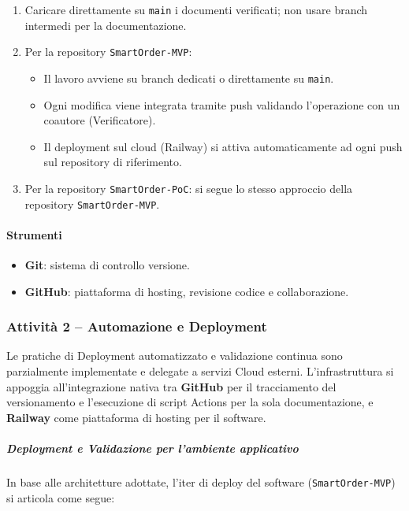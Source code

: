 \documentclass[a4paper, 11pt, oneside]{scrartcl}
\begin{document}
\begin{enumerate}
    \item Caricare direttamente su \texttt{main} i documenti verificati; non usare branch intermedi per la documentazione.
    \item Per la repository \texttt{SmartOrder-MVP}:
    \begin{itemize}
        \item Il lavoro avviene su branch dedicati o direttamente su \texttt{main}.
        \item Ogni modifica viene integrata tramite push validando l'operazione con un coautore (Verificatore).
        \item Il deployment sul cloud (Railway) si attiva automaticamente ad ogni push sul repository di riferimento.
    \end{itemize}
    \item Per la repository \texttt{SmartOrder-PoC}: si segue lo stesso approccio della repository \texttt{SmartOrder-MVP}.
\end{enumerate}

\paragraph{Strumenti}
\begin{itemize}
    \item \textbf{Git}: sistema di controllo versione.
    \item \textbf{GitHub}: piattaforma di hosting, revisione codice e collaborazione.
\end{itemize}

\subsubsection{Attività 2 – Automazione e Deployment}

Le pratiche di Deployment automatizzato e validazione continua sono parzialmente implementate e delegate a servizi Cloud esterni.
L'infrastruttura si appoggia all'integrazione nativa tra \textbf{GitHub} per il tracciamento del versionamento e l'esecuzione di script Actions per la sola documentazione, e \textbf{Railway} come piattaforma di hosting per il software.

\subparagraph{Deployment e Validazione per l'ambiente applicativo}

In base alle architetture adottate, l'iter di deploy del software (\texttt{SmartOrder-MVP}) si articola come segue:
\end{document}
